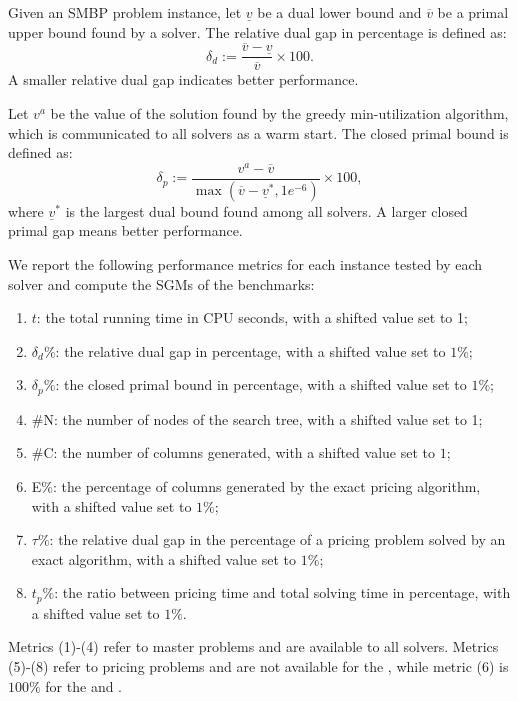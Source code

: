 Given an SMBP problem instance, let $\underline{v}$ be a dual lower bound
and $\overline{v}$ be a primal upper bound found by a solver. The relative dual gap in percentage is defined as:
\begin{equation*}
   \delta_d := \frac{\overline{v} - \underline{v}}{\overline{v}}\times 100.
\end{equation*}
A smaller relative dual gap indicates better performance.
 
 Let $v^a$ be the value of the solution found by the greedy min-utilization algorithm, which is communicated to all solvers as a warm start. The closed primal bound is defined as:
 \begin{equation*} \delta_p := \frac{v^a - \overline{v}}{ \max(\overline{v}- \underline{v}^\ast, 1e^{-6})} \times 100,
\end{equation*}
where $\underline{v}^\ast$ is the largest dual bound found among all solvers. A larger closed primal gap means better performance.

We report the following performance metrics for each instance tested by each solver and compute the SGMs of the benchmarks:
 
\begin{enumerate}
    \item $t$: the total running time in CPU seconds, with a shifted value set to 1;
   \item $\delta_d\%$: the relative dual gap in percentage, with a shifted value set to $1\%$;
   \item $\delta_p\%$: the closed primal bound in percentage, with a shifted value set to $1\%$;
   \item \#N:  the number of nodes of the search tree, with a shifted value set to 1;
  \item  \#C: the number of columns generated, with a shifted value set to $1$;
   \item E\%: the percentage of columns generated by the exact pricing algorithm, with a shifted value set to $1\%$;
   \item $\tau\%$: the relative dual gap in the percentage of a pricing problem solved by an exact algorithm, with a shifted value set to $1\%$;
	 \item $t_p\%$: the ratio between pricing time and total solving time in percentage, with a shifted value set to $1\%$.
\end{enumerate}

Metrics (1)-(4) refer to master problems and are available to all solvers. Metrics (5)-(8) refer to pricing problems and are not available for the \bsocpcomp, while metric (6) is $100\%$ for the \dwpwl and \dwbc.


